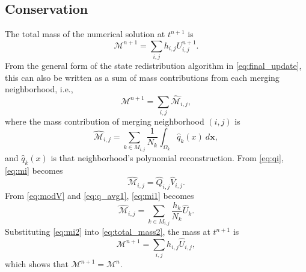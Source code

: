 \subsection{Conservation}\label{sec:cons}
The total mass of the numerical solution at $t^{n+1}$ is
\begin{equation}\label{eq:total_mass}
\mathcal{M}^{n+1} = \sum_{i,j} h_{i,j} U^{n+1}_{i,j}.
\end{equation}
From the general form of the state redistribution algorithm 
in \eqref{eq:final_update}, this can also be written as a sum of mass contributions from each 
merging neighborhood, i.e.,
\begin{equation}\label{eq:total_mass2}
\mathcal{M}^{n+1} = \sum_{i,j} \hat{\mathcal{M}}_{i,j},
\end{equation}
where the mass contribution of merging neighborhood $(i,j)$ is
\begin{equation}\label{eq:mi}
\hat{\mathcal{M}}_{i,j} = \sum_{k \in M_{i,j}}\frac{1}{N_{k}} \int_{\Omega_{k}}\hat q_{k}(x) ~d\mathbf{x},
\end{equation}
and $\hat q_{k}(x)$ is that neighborhood's polynomial reconstruction.  
From \eqref{eq:qi}, \eqref{eq:mi} becomes
\begin{equation}\label{eq:mi1}
\hat{\mathcal{M}}_{i,j} = \hat Q_{i,j} \hat V_{i,j}.
\end{equation}
From \eqref{eq:modV} and \eqref{eq:q_avg1}, \eqref{eq:mi1} becomes
\begin{equation}\label{eq:mi2}
\hat{\mathcal{M}}_{i,j} = \sum_{k \in M_{i,j} }\frac{h_{k}}{N_{k}} \hat U_{k}.
\end{equation}
Substituting \eqref{eq:mi2} into \eqref{eq:total_mass2}, the mass at $t^{n+1}$ is
$$
\mathcal{M}^{n+1} = \sum_{i,j} h_{i,j} \hat U_{i,j},
$$
which shows that $\mathcal{M}^{n+1}  = \mathcal{M}^{n} $.

	
